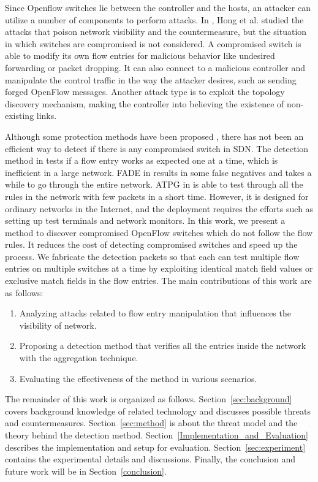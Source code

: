 \documentclass[conference]{IEEEtran}
\begin{document}
Since Openflow switches lie between the controller and the hosts, an attacker can utilize a number of components to perform attacks. In \cite{HXWG15}, Hong et al. studied the attacks that poison network visibility and the countermeasure, but the situation in which switches are compromised is not considered. A compromised switch is able to modify its own flow entries for malicious behavior like undesired forwarding or packet dropping. It can also connect to a malicious controller and manipulate the control traffic in the way the attacker desires, such as sending forged OpenFlow messages. Another attack type is to exploit the topology discovery mechanism, making the controller into believing the existence of non-existing links.

Although some protection methods have been proposed \cite{CKGL15,PJL16}, there has not been an efficient way to detect if there is any compromised switch in SDN. The detection method in \cite{CKGL15} tests if a flow entry works as expected one at a time, which is inefficient in a large network. FADE in \cite{PJL16} results in some false negatives and takes a while to go through the entire network. ATPG in \cite{ZKVM12} is able to test through all the rules in the network with few packets in a short time. However, it is designed for ordinary networks in the Internet, and the deployment requires the efforts such as setting up test terminals and network monitors. In this work, we present a method to discover compromised OpenFlow switches which do not follow the flow rules. It reduces the cost of detecting compromised switches and speed up the process. We fabricate the detection packets so that each can test multiple flow entries on multiple switches at a time by exploiting identical match field values or exclusive match fields in the flow entries. The main contributions of this work are as follows:

\begin{enumerate}
\item
Analyzing attacks related to flow entry manipulation that influences the visibility of network.
\item
Proposing a detection method that verifies all the entries inside the network with the aggregation technique.
\item
Evaluating the effectiveness of the method in various scenarios.
\end{enumerate}

The remainder of this work is organized as follows. Section~\ref{sec:background} covers background knowledge of related technology and discusses possible threats and countermeasures. Section~\ref{sec:method} is about the threat model and the theory behind the detection method. Section~\ref{Implementation_and_Evaluation} describes the implementation and setup for evaluation. Section~\ref{sec:experiment} contains the experimental details and discussions. Finally, the conclusion and future work will be in Section~\ref{conclusion}.
\end{document}
